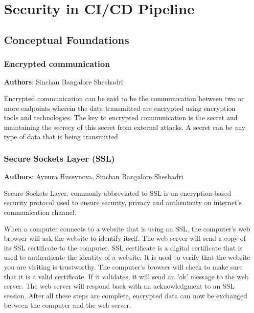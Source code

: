\section{Security in CI/CD Pipeline}

\subsection{Conceptual Foundations}

\subsubsection{Encrypted communication}

\textbf{Authors}: Sinchan Bangalore Sheshadri

Encrypted communication can be said to be the communication between two or more endpoints wherein the data transmitted are encrypted using encryption tools and technologies. The key to encrypted communication is the secret and maintaining the secrecy of this secret from external attacks. A secret can be any type of data that is being transmitted

\subsubsection{Secure Sockets Layer (SSL)}
\textbf{Authors}: Aynura Huseynova, Sinchan Bangalore Sheshadri

Secure Sockets Layer, commonly abbreviated to SSL is an encryption-based security protocol used to ensure security, privacy and authenticity on internet's communication channel.

When a computer connects to a website that is using an SSL, the computer’s web browser will ask the website to identify itself. The web server will send a copy of its SSL certificate to the computer. SSL certificate is a digital certificate that is used to authenticate the identity of a website. It is used to verify that the website you are visiting is trustworthy. The computer’s browser will check to make sure that it is a valid certificate. If it validates, it will send an 'ok' message to the web server. The web server will respond back with an acknowledgment to an SSL session. After all these steps are complete, encrypted data can now be exchanged between the computer and the web server.\footnotemark


